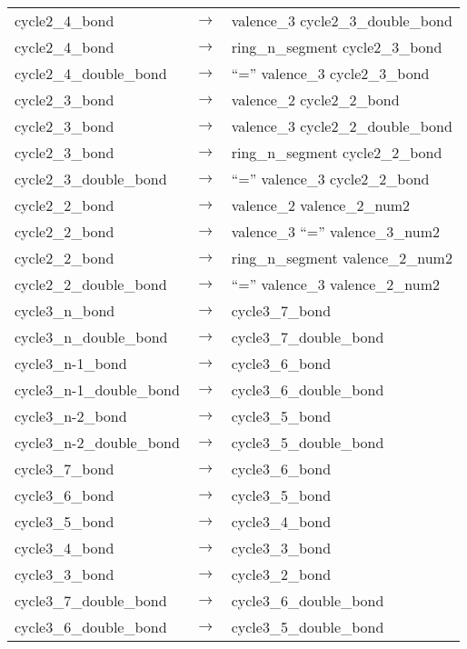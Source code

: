 \documentclass[../Document.tex]{subfiles}
\begin{document}
\begin{longtable}{m{} p{} p{}}
    cycle2\_4\_bond & $\rightarrow$ & valence\_3 cycle2\_3\_double\_bond \\
    cycle2\_4\_bond & $\rightarrow$ & ring\_n\_segment cycle2\_3\_bond \\
    cycle2\_4\_double\_bond & $\rightarrow$ & ``='' valence\_3 cycle2\_3\_bond \\
    cycle2\_3\_bond & $\rightarrow$ & valence\_2 cycle2\_2\_bond \\
    cycle2\_3\_bond & $\rightarrow$ & valence\_3 cycle2\_2\_double\_bond \\
    cycle2\_3\_bond & $\rightarrow$ & ring\_n\_segment cycle2\_2\_bond \\
    cycle2\_3\_double\_bond & $\rightarrow$ & ``='' valence\_3 cycle2\_2\_bond \\
    cycle2\_2\_bond & $\rightarrow$ & valence\_2 valence\_2\_num2 \\
    cycle2\_2\_bond & $\rightarrow$ & valence\_3 ``='' valence\_3\_num2 \\
    cycle2\_2\_bond & $\rightarrow$ & ring\_n\_segment valence\_2\_num2 \\
    cycle2\_2\_double\_bond & $\rightarrow$ & ``='' valence\_3 valence\_2\_num2 \\
    cycle3\_n\_bond & $\rightarrow$ & cycle3\_7\_bond \\
    cycle3\_n\_double\_bond & $\rightarrow$ & cycle3\_7\_double\_bond \\
    cycle3\_n-1\_bond & $\rightarrow$ & cycle3\_6\_bond \\
    cycle3\_n-1\_double\_bond & $\rightarrow$ & cycle3\_6\_double\_bond \\
    cycle3\_n-2\_bond & $\rightarrow$ & cycle3\_5\_bond \\
    cycle3\_n-2\_double\_bond & $\rightarrow$ & cycle3\_5\_double\_bond \\
    cycle3\_7\_bond & $\rightarrow$ & cycle3\_6\_bond \\
    cycle3\_6\_bond & $\rightarrow$ & cycle3\_5\_bond \\
    cycle3\_5\_bond & $\rightarrow$ & cycle3\_4\_bond \\
    cycle3\_4\_bond & $\rightarrow$ & cycle3\_3\_bond \\
    cycle3\_3\_bond & $\rightarrow$ & cycle3\_2\_bond \\
    cycle3\_7\_double\_bond & $\rightarrow$ & cycle3\_6\_double\_bond \\
    cycle3\_6\_double\_bond & $\rightarrow$ & cycle3\_5\_double\_bond \\

\end{longtable}
\end{document}
